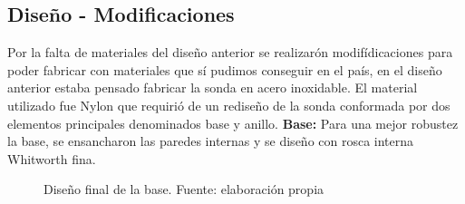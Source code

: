 \begin{appendices}
\subsection{Diseño - Modificaciones}
Por la falta de materiales del dise\~no anterior 
se realizar\'on modif\'idicaciones para poder fabricar con materiales que s\'i pudimos conseguir en el pa\'is, 
en el diseño anterior estaba pensado fabricar la sonda en acero inoxidable.
El material utilizado fue Nylon que requiri\'o de un rediseño de la sonda conformada por dos elementos principales denominados base y anillo. 
\textbf{Base: }
Para una mejor robustez la base, se ensancharon las paredes internas y se dise\~no con  rosca interna Whitworth fina.\\ 
\begin{figure}[ht]
\centering
{}
\caption{Dise\~no final de la base. Fuente: elaboración propia}
\label{fig:Base2019}
\end{figure}


\end{appendices}
